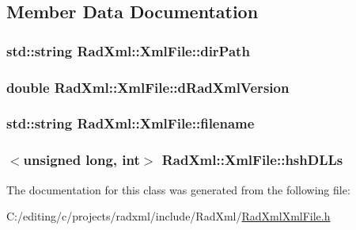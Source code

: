 

\subsection{Member Data Documentation}
\hypertarget{class_rad_xml_1_1_xml_file_a4c864ff74c563f379e3d5a5de44f1074}{
\subsubsection[{dir\-Path}]{\setlength{\rightskip}{0pt plus 5cm}std\-::string Rad\-Xml\-::\-Xml\-File\-::dir\-Path\hspace{0.3cm}{\ttfamily [protected]}}}\label{class_rad_xml_1_1_xml_file_a4c864ff74c563f379e3d5a5de44f1074}
\hypertarget{class_rad_xml_1_1_xml_file_a6242900d28a2af14f3abc34b36a94c3a}{
\subsubsection[{d\-Rad\-Xml\-Version}]{\setlength{\rightskip}{0pt plus 5cm}double Rad\-Xml\-::\-Xml\-File\-::d\-Rad\-Xml\-Version\hspace{0.3cm}{\ttfamily [protected]}}}\label{class_rad_xml_1_1_xml_file_a6242900d28a2af14f3abc34b36a94c3a}
\hypertarget{class_rad_xml_1_1_xml_file_ab9f8fed4cd65ae694630e081b17c68b6}{
\subsubsection[{filename}]{\setlength{\rightskip}{0pt plus 5cm}std\-::string Rad\-Xml\-::\-Xml\-File\-::filename\hspace{0.3cm}{\ttfamily [protected]}}}\label{class_rad_xml_1_1_xml_file_ab9f8fed4cd65ae694630e081b17c68b6}
\hypertarget{class_rad_xml_1_1_xml_file_ad36527c7a674a1dffaa94ff0c6ad7e15}{
\subsubsection[{hsh\-D\-L\-Ls}]{$<$unsigned long, int$>$ Rad\-Xml\-::\-Xml\-File\-::hsh\-D\-L\-Ls\hspace{0.3cm}{\ttfamily [protected]}}}\label{class_rad_xml_1_1_xml_file_ad36527c7a674a1dffaa94ff0c6ad7e15}


The documentation for this class was generated from the following file\-:\begin{DoxyCompactItemize}
\item 
C\-:/editing/c/projects/radxml/include/\-Rad\-Xml/\hyperlink{_rad_xml_xml_file_8h}{Rad\-Xml\-Xml\-File.\-h}\end{DoxyCompactItemize}
